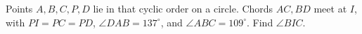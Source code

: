 Points $A,B,C,P,D$ lie in that cyclic order on a circle. Chords $AC,BD$ meet at $I$, with $PI=PC=PD$, $\angle DAB=137^\circ$, and $\angle ABC=109^\circ$. Find $\angle BIC$.
